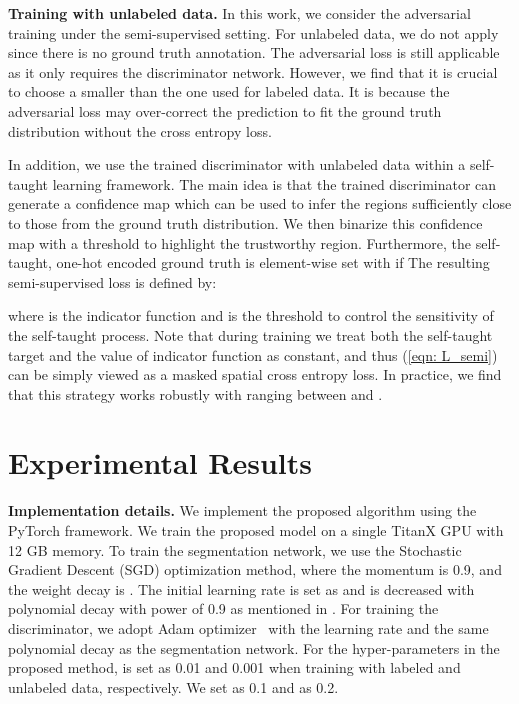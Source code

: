 \documentclass{bmvc2k}
\begin{document}
	\vspace{-2mm}		
	{\flushleft \bf Training with unlabeled data.}
In this work, we consider the adversarial training under the semi-supervised setting.
For unlabeled data, we do not apply  since there is no ground truth annotation.
The adversarial loss  is still applicable as it only requires the discriminator network.
However, we find that it is crucial to choose a smaller  than the one 
	used for labeled data.
It is because the adversarial loss may over-correct the prediction to fit the ground truth distribution without the cross entropy loss.
	
	In addition, we use the trained discriminator with unlabeled data within a  
	self-taught learning framework.
The main idea is that the trained discriminator can generate a confidence 
	map  which can be used to infer the regions 
	sufficiently close to those from the ground truth distribution.
We then binarize this confidence map with a threshold to highlight the trustworthy region. Furthermore, the self-taught, one-hot encoded ground truth  is element-wise set with  if 
The resulting semi-supervised loss is defined by:

where  is the indicator function and  is the threshold to control the sensitivity of the self-taught process.
Note that during training we treat both the self-taught target  and the value of indicator function as constant, and thus (\ref{eqn: L_semi}) can be simply viewed as a masked spatial cross entropy loss.
In practice, we find that this strategy works robustly with  ranging between  and .
	


	\vspace{-3mm}
	\section{Experimental Results}
	\vspace{-2mm}	
	{\flushleft \bf Implementation details.}
We implement the proposed algorithm using the PyTorch framework.
We train the proposed model on a single TitanX GPU with 12 GB memory.
To train the segmentation network, we use the Stochastic Gradient Descent (SGD) optimization method, where the momentum is 0.9, and the weight decay is .
The initial learning rate is set as  and is decreased with polynomial decay with power of 0.9 as mentioned in \cite{deeplab}.
For training the discriminator, we adopt Adam optimizer~\cite{kingma2014adam} with the learning rate  and the same polynomial decay as the segmentation network.
For the hyper-parameters in the proposed method,  is set as 0.01 and 0.001 when training with labeled and unlabeled data, respectively.
We set  as 0.1 and  as 0.2.
	
\end{document}
